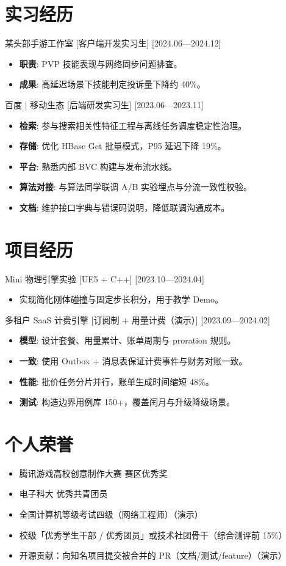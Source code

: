 \documentclass{resume-photo}
\begin{document}
\section{实习经历}
\ResumeItem
{某头部手游工作室}
[\textnormal{客户端开发实习生}]
[2024.06—2024.12]

\begin{itemize}
  \item \textbf{职责}: PVP 技能表现与网络同步问题排查。
  \item \textbf{成果}: 高延迟场景下技能判定投诉量下降约 40\%。
\end{itemize}


\ResumeItem
{百度 | 移动生态}
[\textnormal{后端研发实习生}]
[2023.06—2023.11]

\begin{itemize}
  \item \textbf{检索}: 参与搜索相关性特征工程与离线任务调度稳定性治理。
  \item \textbf{存储}: 优化 HBase Get 批量模式，P95 延迟下降 19\%。
  \item \textbf{平台}: 熟悉内部 BVC 构建与发布流水线。
  \item \textbf{算法对接}: 与算法同学联调 A/B 实验埋点与分流一致性校验。
  \item \textbf{文档}: 维护接口字典与错误码说明，降低联调沟通成本。
\end{itemize}



\section{项目经历}
\ResumeItem
{Mini 物理引擎实验}
[\textnormal{UE5 + C++}]
[2023.10—2024.04]

\begin{itemize}
  \item 实现简化刚体碰撞与固定步长积分，用于教学 Demo。
\end{itemize}


\ResumeItem
{多租户 SaaS 计费引擎}
[\textnormal{订阅制 + 用量计费（演示）}]
[2023.09—2024.02]

\begin{itemize}
  \item \textbf{模型}: 设计套餐、用量累计、账单周期与 proration 规则。
  \item \textbf{一致}: 使用 Outbox + 消息表保证计费事件与财务对账一致。
  \item \textbf{性能}: 批价任务分片并行，账单生成时间缩短 48\%。
  \item \textbf{测试}: 构造边界用例库 150+，覆盖闰月与升级降级场景。
\end{itemize}



\section{个人荣誉}
\begin{itemize}
  \item 腾讯游戏高校创意制作大赛 赛区优秀奖
  \item 电子科大 优秀共青团员
  \item 全国计算机等级考试四级（网络工程师）（演示）
  \item 校级「优秀学生干部 / 优秀团员」或技术社团骨干（综合测评前 15\%）
  \item 开源贡献：向知名项目提交被合并的 PR（文档/测试/feature）（演示）
\end{itemize}
\end{document}
